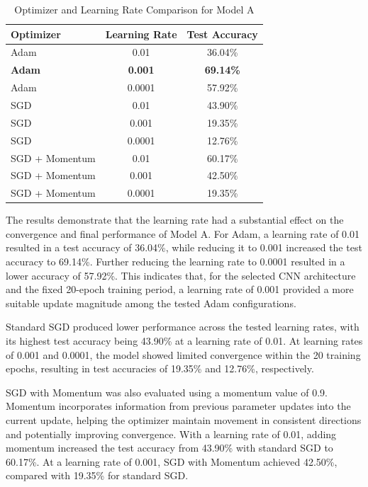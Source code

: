 \documentclass[12pt,a4paper]{article}
\begin{document}
\begin{table}[H]
\centering
\caption{Optimizer and Learning Rate Comparison for Model A}
\label{tab:optimizer_comparison_a}
\begin{tabular}{lcc}
\hline
\textbf{Optimizer} & \textbf{Learning Rate} & \textbf{Test Accuracy} \\
\hline
Adam & 0.01 & 36.04\% \\
\textbf{Adam} & \textbf{0.001} & \textbf{69.14\%} \\
Adam & 0.0001 & 57.92\% \\
\hline
SGD & 0.01 & 43.90\% \\
SGD & 0.001 & 19.35\% \\
SGD & 0.0001 & 12.76\% \\
\hline
SGD + Momentum & 0.01 & 60.17\% \\
SGD + Momentum & 0.001 & 42.50\% \\
SGD + Momentum & 0.0001 & 19.35\% \\
\hline
\end{tabular}
\end{table}

The results demonstrate that the learning rate had a substantial effect on
the convergence and final performance of Model A. For Adam, a learning rate
of 0.01 resulted in a test accuracy of 36.04\%, while reducing it to 0.001
increased the test accuracy to 69.14\%. Further reducing the learning rate
to 0.0001 resulted in a lower accuracy of 57.92\%. This indicates that, for
the selected CNN architecture and the fixed 20-epoch training period, a
learning rate of 0.001 provided a more suitable update magnitude among the
tested Adam configurations.

Standard SGD produced lower performance across the tested learning rates,
with its highest test accuracy being 43.90\% at a learning rate of 0.01.
At learning rates of 0.001 and 0.0001, the model showed limited convergence
within the 20 training epochs, resulting in test accuracies of 19.35\% and
12.76\%, respectively.

SGD with Momentum was also evaluated using a momentum value of 0.9.
Momentum incorporates information from previous parameter updates into the
current update, helping the optimizer maintain movement in consistent
directions and potentially improving convergence. With a learning rate of
0.01, adding momentum increased the test accuracy from 43.90\% with
standard SGD to 60.17\%. At a learning rate of 0.001, SGD with Momentum
achieved 42.50\%, compared with 19.35\% for standard SGD.
\end{document}
